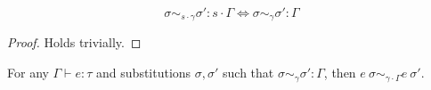 \begin{lemma}
  \label{thm:sub-scaling}
  $$\sigma \sim_{s \cdot \gamma} \sigma' : s \cdot \Gamma \iff \sigma
  \sim_{\gamma} \sigma' : \Gamma$$
\end{lemma}
\begin{proof}
  Holds trivially.
\end{proof}


\begin{theorem}
  For any $\Gamma \vdash e : \tau$ and substitutions $\sigma, \sigma'$ such that
  $\sigma \sim_{\gamma} \sigma' : \Gamma$, then 
  $e~\sigma \sim_{\gamma \cdot \Gamma} e~\sigma'$.
\end{theorem}

